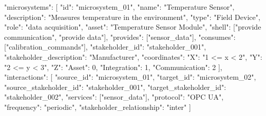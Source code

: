 {
  "microsystems": [
    {
      "id": "microsystem_01",
      "name": "Temperature Sensor",
      "description": "Measures temperature in the environment",
      "type": "Field Device",
      "role": "data acquisition",
      "asset": "Temperature Sensor Module",
      "shell": ["provide communication", "provide data"],
      "provides": ["sensor_data"],
      "consumes": ["calibration_commands"],
      "stakeholder_id": "stakeholder_001",
      "stakeholder_description": "Manufacturer",
      "coordinates": {
        "X": "1 <= x < 2",
        "Y": "2 <= y < 3",
        "Z": {
          "Asset": 0,
          "Integration": 1,
          "Communication": 2
        }
      }
    }
  ],
  "interactions": [
    {
      "source_id": "microsystem_01",
      "target_id": "microsystem_02",
      "source_stakeholder_id": "stakeholder_001",
      "target_stakeholder_id": "stakeholder_002",
      "services": ["sensor_data"],
      "protocol": "OPC UA",
      "frequency": "periodic",
      "stakeholder_relationship": "inter"
    }
  ]
}